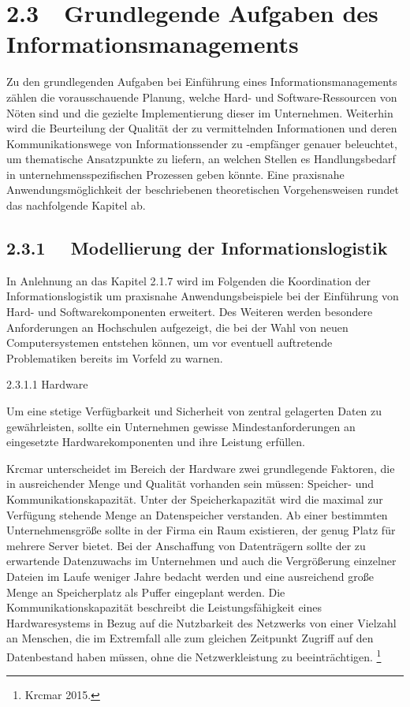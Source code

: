 \documentclass{article}
\title{}
\begin{document}
\section[2.3\ \ Grundlegende Aufgaben des Informationsmanagements]{2.3\ \ Grundlegende Aufgaben des
Informationsmanagements}
Zu den grundlegenden Aufgaben bei Einführung eines Informationsmanagements zählen die vorausschauende Planung, welche
Hard- und Software-Ressourcen von Nöten sind und die gezielte Implementierung dieser im Unternehmen. Weiterhin wird die
Beurteilung der Qualität der zu vermittelnden Informationen und deren Kommunikationswege von Informationssender zu
-empfänger genauer beleuchtet, um thematische Ansatzpunkte zu liefern, an welchen Stellen es Handlungsbedarf in
unternehmensspezifischen Prozessen geben könnte. Eine praxisnahe Anwendungsmöglichkeit der beschriebenen theoretischen
Vorgehensweisen rundet das nachfolgende Kapitel ab. 

\subsection[2.3.1 \ \ Modellierung der Informationslogistik]{2.3.1 \ \ Modellierung der Informationslogistik}
In Anlehnung an das Kapitel 2.1.7 wird im Folgenden die Koordination der Informationslogistik um praxisnahe
Anwendungsbeispiele bei der Einführung von Hard- und Softwarekomponenten erweitert. Des Weiteren werden besondere
Anforderungen an Hochschulen aufgezeigt, die bei der Wahl von neuen Computersystemen entstehen können, um vor eventuell
auftretende Problematiken bereits im Vorfeld zu warnen. \ \ 


\bigskip

2.3.1.1 Hardware


\bigskip

Um eine stetige Verfügbarkeit und Sicherheit von zentral gelagerten Daten zu gewährleisten, sollte ein Unternehmen
gewisse Mindestanforderungen an eingesetzte Hardwarekomponenten und ihre Leistung erfüllen. 


\bigskip

Krcmar unterscheidet im Bereich der Hardware zwei grundlegende Faktoren, die in ausreichender Menge und Qualität
vorhanden sein müssen: Speicher- und Kommunikationskapazität. Unter der Speicherkapazität wird die maximal zur
Verfügung stehende Menge an Datenspeicher verstanden. Ab einer bestimmten Unternehmensgröße sollte in der Firma ein
Raum existieren, der genug Platz für mehrere Server bietet. Bei der Anschaffung von Datenträgern sollte der zu
erwartende Datenzuwachs im Unternehmen und auch die Vergrößerung einzelner Dateien im Laufe weniger Jahre bedacht
werden und eine ausreichend große Menge an Speicherplatz als Puffer eingeplant werden. Die Kommunikationskapazität
beschreibt die Leistungsfähigkeit eines Hardwaresystems in Bezug auf die Nutzbarkeit des Netzwerks von einer Vielzahl
an Menschen, die im Extremfall alle zum gleichen Zeitpunkt Zugriff auf den Datenbestand haben müssen, ohne die
Netzwerkleistung zu beeinträchtigen. \footnote{Krcmar 2015.}
\end{document}
